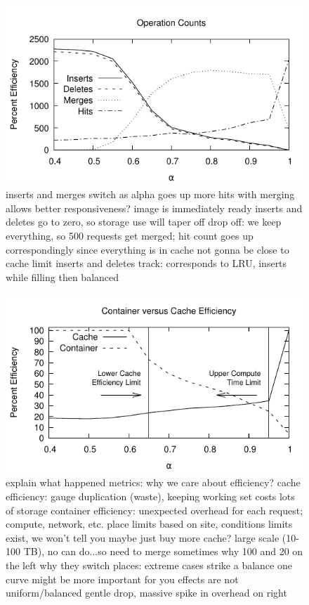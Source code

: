 \documentclass[sigconf]{acmart}
\begin{document}
\begin{figure}
\includegraphics[width=\linewidth]{curated/comparative/operation_count.pdf}
\label{fig:opcounts}
inserts and merges switch as alpha goes up
more hits with merging
allows better responsiveness? image is immediately ready
inserts and deletes go to zero, so storage use will taper off
drop off: we keep everything, so 500 requests get merged; hit count goes up correspondingly since everything is in cache
not gonna be close to cache limit
inserts and deletes track: corresponds to LRU, inserts while filling then balanced
\fi
\end{figure}

\begin{figure}
\includegraphics[width=\linewidth]{curated/comparative/distribution_efficiency.pdf}
\label{fig:dist-eff}
explain what happened
metrics: why we care about efficiency?
cache efficiency: gauge duplication (waste), keeping working set costs lots of storage
container efficiency: unexpected overhead for each request; compute, network, etc.
place limits based on site, conditions
limits exist, we won't tell you
maybe just buy more cache?
large scale (10-100 TB), no can do...so need to merge sometimes
why 100 and 20 on the left
why they switch places: extreme cases
strike a balance
one curve might be more important for you
effects are not uniform/balanced gentle drop, massive spike in overhead on right
\fi
\end{figure}
\end{document}
